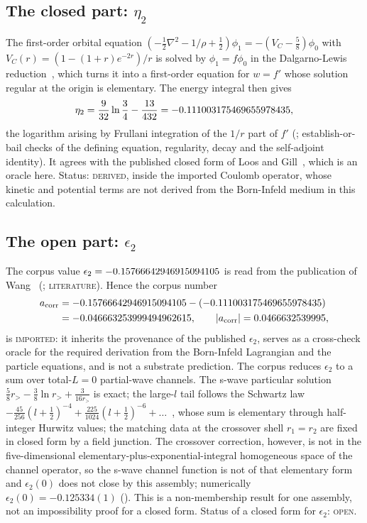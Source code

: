 \documentclass[aps,prd,onecolumn,amsmath,amssymb,longbibliography,floatfix,nofootinbib]{revtex4-2}
\newcommand{\acorr}{a_{\mathrm{corr}}}
\newcommand{\st}[1]{\textsc{#1}}
\begin{document}
\subsection{The closed part: \texorpdfstring{$\eta_2$}{eta_2}}
The first-order orbital equation $(-\tfrac12\nabla^2-1/\rho+\tfrac12)\phi_1=-(V_C-\tfrac58)\phi_0$ with $V_C(r)=(1-(1+r)e^{-2r})/r$ is solved by $\phi_1=f\phi_0$ in the Dalgarno-Lewis reduction~\cite{DalgarnoLewis1955}, which turns it into a first-order equation for $w=f'$ whose solution regular at the origin is elementary. The energy integral then gives
\begin{equation}
\eta_2=\frac{9}{32}\ln\frac34-\frac{13}{432}=-0.111003175469655978435 ,
\end{equation}
the logarithm arising by Frullani integration of the $1/r$ part of $f'$ (; establish-or-bail checks of the defining equation, regularity, decay and the self-adjoint identity). It agrees with the published closed form of Loos and Gill~\cite{LoosGill2009}, which is an oracle here. Status: \st{derived}, inside the imported Coulomb operator, whose kinetic and potential terms are not derived from the Born-Infeld medium in this calculation.

\subsection{The open part: \texorpdfstring{$\epsilon_2$}{epsilon_2}}
The corpus value $\epsilon_2=-0.15766642946915094105$ is read from the publication of Wang~\cite{Wang2013} (; \st{literature}). Hence the corpus number
\begin{align}
\acorr&=\EpsTwoVal-(\EtaTwoVal)\nonumber\\
&=\AcorrDiagVal ,\qquad |\acorr|=\AcorrMagVal ,
\end{align}
is \st{imported}: it inherits the provenance of the published $\epsilon_2$, serves as a cross-check oracle for the required derivation from the Born-Infeld Lagrangian and the particle equations, and is not a substrate prediction. The corpus reduces $\epsilon_2$ to a sum over total-$L=0$ partial-wave channels. The s-wave particular solution $\tfrac58r_>-\tfrac38\ln r_>+\tfrac{3}{16r_>}$ is exact; the large-$l$ tail follows the Schwartz law $-\tfrac{45}{256}(l+\tfrac12)^{-4}+\tfrac{225}{1024}(l+\tfrac12)^{-6}+\dots$~\cite{Schwartz1962}, whose sum is elementary through half-integer Hurwitz values; the matching data at the crossover shell $r_1=r_2$ are fixed in closed form by a field junction. The crossover correction, however, is not in the five-dimensional elementary-plus-exponential-integral homogeneous space of the channel operator, so the s-wave channel function is not of that elementary form and $\epsilon_2(0)$ does not close by this assembly; numerically $\epsilon_2(0)=-0.125334(1)$ (). This is a non-membership result for one assembly, not an impossibility proof for a closed form. Status of a closed form for $\epsilon_2$: \st{open}.
\end{document}
